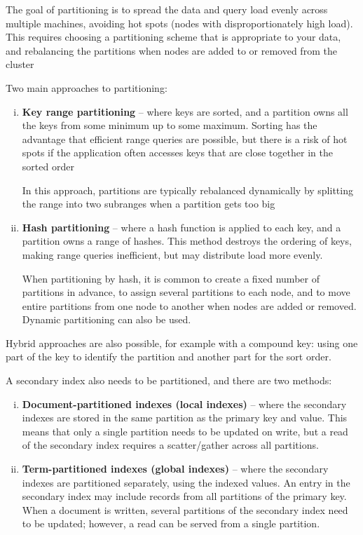 \documentclass{article}
\begin{document}
    The goal of partitioning is to spread the data and query load evenly across multiple machines, avoiding hot spots (nodes with disproportionately high load). This requires choosing a partitioning scheme that is appropriate to your data, and rebalancing the partitions when nodes are added to or removed from the cluster
    
    Two main approaches to partitioning:
    \begin{enumerate}[i.]
        \item \textbf{Key range partitioning} -- where keys are sorted, and a partition owns all the keys from some minimum up to some maximum. Sorting has the advantage that efficient range queries are possible, but there is a risk of hot spots if the application often accesses keys that are close together in the sorted order
        
        In this approach, partitions are typically rebalanced dynamically by splitting the range into two subranges when a partition gets too big
        
        \item \textbf{Hash partitioning} -- where a hash function is applied to each key, and a partition owns a range of hashes. This method destroys the ordering of keys, making range queries inefficient, but may distribute load more evenly. 
        
        When partitioning by hash, it is common to create a fixed number of partitions in advance, to assign several partitions to each node, and to move entire partitions from one node to another when nodes are added or removed. Dynamic partitioning can also be used.
    \end{enumerate}
    
    Hybrid approaches are also possible, for example with a compound key: using one part of the key to identify the partition and another part for the sort order.

    A secondary index also needs to be partitioned, and there are two methods:
    
    \begin{enumerate}[i.]
        \item \textbf{Document-partitioned indexes (local indexes)} --  where the secondary indexes are stored in the same partition as the primary key and value. This means that only a  single partition needs to be updated on write, but a read of the secondary index requires a scatter/gather across all partitions.
        
        \item \textbf{Term-partitioned indexes (global indexes)} -- where the secondary indexes are partitioned separately, using the indexed values. An entry in the secondary index may include records from all partitions of the primary key. When a document is written, several partitions of the secondary index need to be updated; however, a read can be served from a single partition.
    \end{enumerate}
\end{document}
